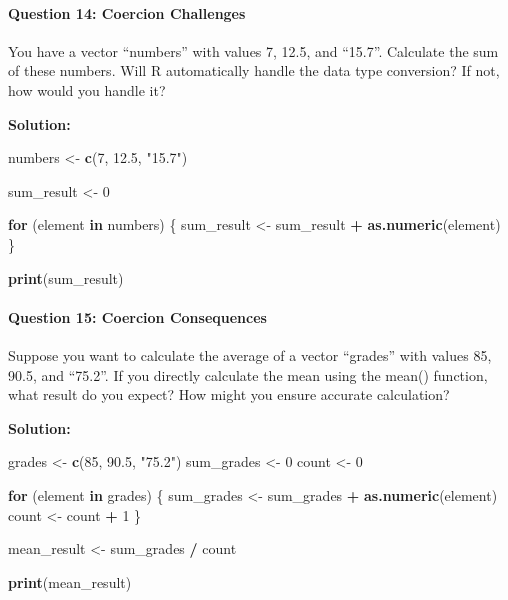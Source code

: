 \documentclass[
]{article}
\newenvironment{Shaded}{\begin{snugshade}}{\end{snugshade}}
\newcommand{\ControlFlowTok}[1]{\textcolor[rgb]{0.13,0.29,0.53}{\textbf{#1}}}
\newcommand{\DecValTok}[1]{\textcolor[rgb]{0.00,0.00,0.81}{#1}}
\newcommand{\FloatTok}[1]{\textcolor[rgb]{0.00,0.00,0.81}{#1}}
\newcommand{\FunctionTok}[1]{\textcolor[rgb]{0.13,0.29,0.53}{\textbf{#1}}}
\newcommand{\NormalTok}[1]{#1}
\newcommand{\OtherTok}[1]{\textcolor[rgb]{0.56,0.35,0.01}{#1}}
\newcommand{\SpecialCharTok}[1]{\textcolor[rgb]{0.81,0.36,0.00}{\textbf{#1}}}
\newcommand{\StringTok}[1]{\textcolor[rgb]{0.31,0.60,0.02}{#1}}
\begin{document}
\hypertarget{question-14-coercion-challenges}{%
\paragraph{Question 14: Coercion
Challenges}\label{question-14-coercion-challenges}}

You have a vector ``numbers'' with values 7, 12.5, and ``15.7''.
Calculate the sum of these numbers. Will R automatically handle the data
type conversion? If not, how would you handle it?

\textbf{Solution:}

\begin{Shaded}
\begin{Highlighting}[]
\NormalTok{numbers }\OtherTok{\textless{}{-}} \FunctionTok{c}\NormalTok{(}\DecValTok{7}\NormalTok{, }\FloatTok{12.5}\NormalTok{, }\StringTok{"15.7"}\NormalTok{)}

\NormalTok{sum\_result }\OtherTok{\textless{}{-}} \DecValTok{0}

\ControlFlowTok{for}\NormalTok{ (element }\ControlFlowTok{in}\NormalTok{ numbers) \{}
\NormalTok{  sum\_result }\OtherTok{\textless{}{-}}\NormalTok{ sum\_result }\SpecialCharTok{+} \FunctionTok{as.numeric}\NormalTok{(element)}
\NormalTok{\}}

\FunctionTok{print}\NormalTok{(sum\_result)}
\end{Highlighting}
\end{Shaded}

\hypertarget{question-15-coercion-consequences}{%
\paragraph{Question 15: Coercion
Consequences}\label{question-15-coercion-consequences}}

Suppose you want to calculate the average of a vector ``grades'' with
values 85, 90.5, and ``75.2''. If you directly calculate the mean using
the mean() function, what result do you expect? How might you ensure
accurate calculation?

\textbf{Solution:}

\begin{Shaded}
\begin{Highlighting}[]
\NormalTok{grades }\OtherTok{\textless{}{-}} \FunctionTok{c}\NormalTok{(}\DecValTok{85}\NormalTok{, }\FloatTok{90.5}\NormalTok{, }\StringTok{"75.2"}\NormalTok{)}
\NormalTok{sum\_grades }\OtherTok{\textless{}{-}} \DecValTok{0}
\NormalTok{count }\OtherTok{\textless{}{-}} \DecValTok{0}

\ControlFlowTok{for}\NormalTok{ (element }\ControlFlowTok{in}\NormalTok{ grades) \{}
\NormalTok{  sum\_grades }\OtherTok{\textless{}{-}}\NormalTok{ sum\_grades }\SpecialCharTok{+} \FunctionTok{as.numeric}\NormalTok{(element)}
\NormalTok{  count }\OtherTok{\textless{}{-}}\NormalTok{ count }\SpecialCharTok{+} \DecValTok{1}
\NormalTok{\}}

\NormalTok{mean\_result }\OtherTok{\textless{}{-}}\NormalTok{ sum\_grades }\SpecialCharTok{/}\NormalTok{ count}

\FunctionTok{print}\NormalTok{(mean\_result)}
\end{Highlighting}
\end{Shaded}
\end{document}
